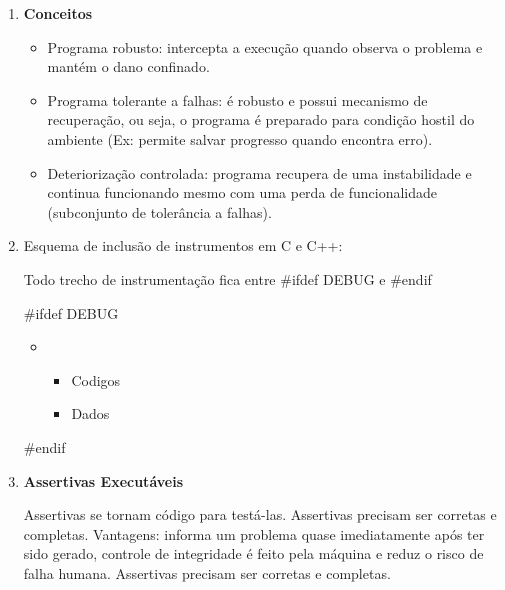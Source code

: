 \documentclass[
	12pt, %
]{fphw}
\begin{document}
\begin{doublespace}
\begin{enumerate}[label=\textbf{\arabic*})]
        \item \textbf{Conceitos}

              \begin{itemize}

                  \item Programa robusto: intercepta a execução quando observa o problema e mantém o dano confinado.
                  \item Programa tolerante a falhas: é robusto e possui mecanismo de recuperação, ou seja, o programa é preparado para condição hostil do ambiente (Ex: permite salvar progresso quando encontra erro).
                  \item Deteriorização controlada: programa recupera de uma instabilidade e continua funcionando mesmo com uma perda de funcionalidade (subconjunto de tolerância a falhas).
              \end{itemize}

        \item Esquema de inclusão de instrumentos em C e C++:

              Todo trecho de instrumentação fica entre \#ifdef \textunderscore DEBUG e \#endif

              \#ifdef \textunderscore DEBUG

              \begin{itemize}

                \item[]

                  \begin{itemize}

                      \item Codigos

                      \item Dados

                  \end{itemize}

              \end{itemize}


              \#endif

        \item \textbf{Assertivas Executáveis}

              Assertivas se tornam código para testá-las. Assertivas precisam ser corretas e completas. Vantagens: informa um problema quase imediatamente após ter sido gerado, controle de integridade é feito pela máquina e reduz o risco de falha humana. Assertivas precisam ser corretas e completas.


\end{enumerate}
\end{doublespace}
\end{document}
